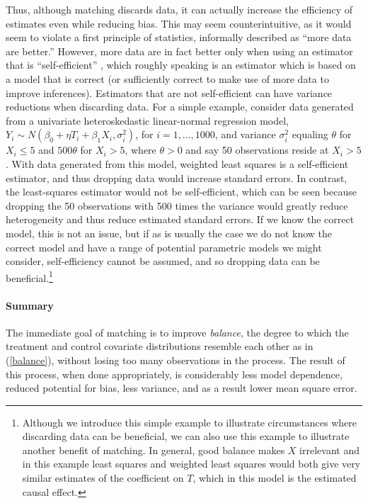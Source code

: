 \documentclass[11pt,titlepage]{article}
\begin{document}
Thus, although matching discards data, it can actually increase the
efficiency of estimates even while reducing bias.  This may seem
counterintuitive, as it would seem to violate a first principle of
statistics, informally described as ``more data are better.''
However, more data are in fact better only when using an estimator
that is ``self-efficient'' \citep{MenRom03}, which roughly speaking is
an estimator which is based on a model that is correct (or
sufficiently correct to make use of more data to improve inferences).
Estimators that are not self-efficient can have variance reductions
when discarding data.  For a simple example, consider data generated
from a univariate heteroskedastic linear-normal regression model,
$Y_i\sim N(\beta_0+\eta T_i+\beta_1 X_i,\sigma_i^2)$, for
$i=1,\dots,1000$, and variance $\sigma^2_i$ equaling $\theta$ for
$X_i\leq 5$ and $500\theta$ for $X_i>5$, where $\theta>0$ and say 50
observations reside at $X_i>5$.  With data generated from this model,
weighted least squares is a self-efficient estimator, and thus
dropping data would increase standard errors.  In contrast, the
least-squares estimator would not be self-efficient, which can be seen
because dropping the 50 observations with 500 times the variance would
greatly reduce heterogeneity and thus reduce estimated standard
errors.  If we know the correct model, this is not an issue, but if as
is usually the case we do not know the correct model and have a range
of potential parametric models we might consider, self-efficiency
cannot be assumed, and so dropping data can be
beneficial.\footnote{Although we introduce this simple example to
  illustrate circumstances where discarding data can be beneficial, we
  can also use this example to illustrate another benefit of matching.
  In general, good balance makes $X$ irrelevant and in this example
  least squares and weighted least squares would both give very
  similar estimates of the coefficient on $T$, which in this model is
  the estimated causal effect.}

\paragraph{Summary}
The immediate goal of matching is to improve \emph{balance}, the
degree to which the treatment and control covariate distributions
resemble each other as in (\ref{balance}), without losing too many
observations in the process.  The result of this process, when done
appropriately, is considerably less model dependence, reduced
potential for bias, less variance, and as a result lower mean square
error.
\end{document}

